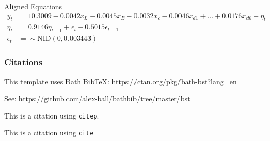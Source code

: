 Aligned Equations
$$
\begin{aligned}
y_t &= 10.3009 -0.0042x_L - 0.0045x_B - 0.0032x_c -0.0046x_{d1} + \ldots + 0.0176x_{d6} + \eta_t \\
\eta_t &= 0.9146\eta_{t-1} + \epsilon_t -0.5015\epsilon_{t-1}\\
\epsilon_t &= \sim \text{NID}(0,0.003443)
\end{aligned}
$$

\subsubsection{Citations}
This template uses Bath BibTeX: \hyperlink{https://ctan.org/pkg/bath-bst?lang=en}{https://ctan.org/pkg/bath-bst?lang=en}

See: \hyperlink{https://github.com/alex-ball/bathbib/tree/master/bst}{https://github.com/alex-ball/bathbib/tree/master/bst}

This is a citation \citep{Elvidge_Baugh_Zhizhin_Hsu_Ghosh_2017} using \texttt{citep}.

This is a citation \cite{Tibshirani_1996} using \texttt{cite}
